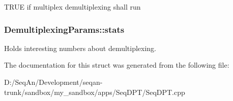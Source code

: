 T\-R\-U\-E if multiplex demultiplexing shall run \hypertarget{struct_demultiplexing_params_a1017a69229d12a8a3714f80e75c3dbb9}{
\subsubsection[{stats}]{ Demultiplexing\-Params\-::stats}}\label{struct_demultiplexing_params_a1017a69229d12a8a3714f80e75c3dbb9}
Holds interesting numbers about demultiplexing. 

The documentation for this struct was generated from the following file\-:\begin{DoxyCompactItemize}
\item 
D\-:/\-Seq\-An/\-Development/seqan-\/trunk/sandbox/my\-\_\-sandbox/apps/\-Seq\-D\-P\-T/Seq\-D\-P\-T.\-cpp\end{DoxyCompactItemize}
